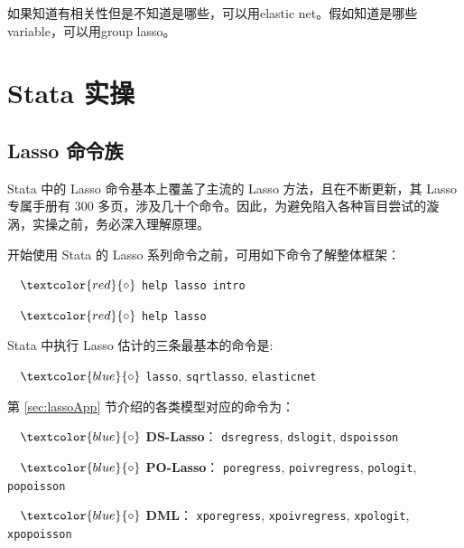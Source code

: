 {如果知道有相关性但是不知道是哪些，可以用elastic net。假如知道是哪些variable，可以用group lasso。

\fi      %


\section{Stata 实操}

\subsection{Lasso 命令族}
Stata 中的 Lasso 命令基本上覆盖了主流的 Lasso 方法，且在不断更新，其 Lasso 专属手册有 300 多页，涉及几十个命令。因此，为避免陷入各种盲目尝试的漩涡，实操之前，务必深入理解原理。

开始使用 Stata 的 Lasso 系列命令之前，可用如下命令了解整体框架：

\vspace{2pt}

$\quad \textcolor{red}{\circ}$ 
         \texttt{help lasso intro}
         
$\quad \textcolor{red}{\circ}$ 
         \texttt{help lasso}

\vspace{2pt} 


Stata 中执行 Lasso 估计的三条最基本的命令是:

\vspace{5pt}
$\quad \textcolor{blue}{\circ}$  
\texttt{lasso}, 
\texttt{sqrtlasso}, 
\texttt{elasticnet}

\vspace{5pt}
第 \ref{sec:lassoApp} 节介绍的各类模型对应的命令为：

\vspace{5pt}
$\quad \textcolor{blue}{\circ}$  
\textbf{DS-Lasso}：
   \texttt{dsregress}, 
   \texttt{dslogit}, 
   \texttt{dspoisson}

$\quad \textcolor{blue}{\circ}$ 
\textbf{PO-Lasso}：
   \texttt{poregress}, 
   \texttt{poivregress}, 
   \texttt{pologit}, 
   \texttt{popoisson}

$\quad \textcolor{blue}{\circ}$ 
\textbf{DML}：
   \texttt{xporegress}, 
   \texttt{xpoivregress}, 
   \texttt{xpologit}, 
   \texttt{xpopoisson}

}
